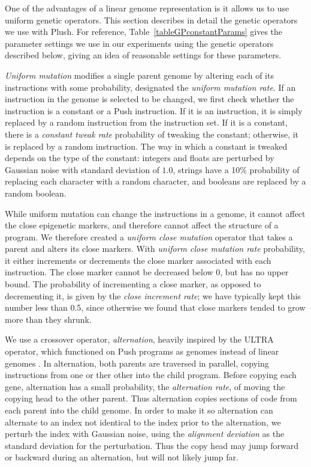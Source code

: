 One of the advantages of a linear genome representation is it allows us to use uniform genetic operators. This section describes in detail the genetic operators we use with Plush. For reference, Table~\ref{tableGPconstantParams} gives the parameter settings we use in our experiments using the genetic operators described below, giving an idea of reasonable settings for these parameters.

\textit{Uniform mutation} modifies a single parent genome by altering each of its instructions with some probability, designated the \textit{uniform mutation rate}. If an instruction in the genome is selected to be changed, we first check whether the instruction is a constant or a Push instruction. If it is an instruction, it is simply replaced by a random instruction from the instruction set. If it is a constant, there is a \textit{constant tweak rate} probability of tweaking the constant; otherwise, it is replaced by a random instruction. The way in which a constant is tweaked depends on the type of the constant: integers and floats are perturbed by Gaussian noise with standard deviation of $1.0$, strings have a 10\% probability of replacing each character with a random character, and booleans are replaced by a random boolean.

While uniform mutation can change the instructions in a genome, it cannot affect the close epigenetic markers, and therefore cannot affect the structure of a program. We therefore created a \textit{uniform close mutation} operator that takes a parent and alters its close markers. With \textit{uniform close mutation rate} probability, it either increments or decrements the close marker associated with each instruction. The close marker cannot be decreased below 0, but has no upper bound. The probability of incrementing a close marker, as opposed to decrementing it, is given by the \textit{close increment rate}; we have typically kept this number less than 0.5, since otherwise we found that close markers tended to grow more than they shrunk.

We use a crossover operator, \textit{alternation}, heavily inspired by the ULTRA operator, which functioned on Push programs as genomes instead of linear genomes \citep{Spector:2013:GPTP}. In alternation, both parents are traversed in parallel, copying instructions from one or ther other into the child program. Before copying each gene, alternation has a small probability, the \textit{alternation rate}, of moving the copying head to the other parent. Thus alternation copies sections of code from each parent into the child genome. In order to make it so alternation can alternate to an index not identical to the index prior to the alternation, we perturb the index with Gaussian noise, using the \textit{alignment deviation} as the standard deviation for the perturbation. Thus the copy head may jump forward or backward during an alternation, but will not likely jump far.

